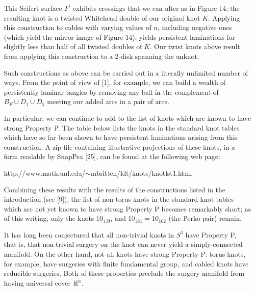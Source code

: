
\vfill\eject

This Seifert surface $F^\prime$ exhibits crossings that we can alter as in Figure 14;
the resulting knot is a twisted Whitehead double of our original knot $K$. Applying this
construction to cables with varying values of $n$, including negative ones (which
yield the mirror image of Figure 14), yields persistent laminations for
slightly less than half of all twisted doubles of $K$. Our twist knots above result 
from applying this construction to a 2-disk spanning the unknot.

\smallskip

Such constructions as above can be carried out in a literally unlimited number of 
ways. From the point of view of [1], for example, we can build a wealth of 
persistently laminar tangles by removing any ball in the complement
of $B_F\cup D_1\cup D_2$ meeting our added arcs in a pair of arcs.

In particular, we can continue to add to the list of knots which are known
to have strong Property P.
The table below lists the knots in the standard knot tables which have so far 
been shown to have persistent laminations arising from this construction. A zip file
containing illustrative projections of these knots, in a form readable by
SnapPea [25], can be found at the following web page:

\centerline{http://www.math.unl.edu/$\sim$mbritten/ldt/knots/knotlst1.html} 

\smallskip



\vfill\eject

Combining these results with the results of the constructions listed in the introduction
(see [9]), the list of non-torus knots in the standard knot tables which are not yet
known to have strong Property P becomes remarkably short; 
as of this writing, only the knots $10_{139}$,
and $10_{161}=10_{162}$ (the Perko pair) remain.

\vglue 12pt
\vglue 5pt


It has long been conjectured that all non-trivial knots in $S^3$ have 
Property P, that is, that non-trivial surgery on the knot can never 
yield a simply-connected manifold. On the other hand, not all knots 
have strong Property P: torus knots, for example, have surgeries with 
finite fundamental group, and cabled knots have reducible surgeries. 
Both of these properties preclude the surgery manifold from having 
universal cover ${\Bbb R}^3$.

